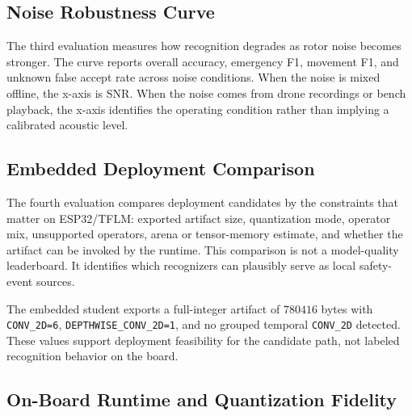\subsection{Noise Robustness Curve}

The third evaluation measures how recognition degrades as rotor noise becomes stronger. The curve reports overall accuracy, emergency F1, movement F1, and unknown false accept rate across noise conditions. When the noise is mixed offline, the x-axis is SNR. When the noise comes from drone recordings or bench playback, the x-axis identifies the operating condition rather than implying a calibrated acoustic level.

\subsection{Embedded Deployment Comparison}

The fourth evaluation compares deployment candidates by the constraints that matter on ESP32/TFLM: exported artifact size, quantization mode, operator mix, unsupported operators, arena or tensor-memory estimate, and whether the artifact can be invoked by the runtime. This comparison is not a model-quality leaderboard. It identifies which recognizers can plausibly serve as local safety-event sources.

The embedded student exports a full-integer artifact of $780416$ bytes with \texttt{CONV\_2D=6}, \texttt{DEPTHWISE\_CONV\_2D=1}, and no grouped temporal \texttt{CONV\_2D} detected. These values support deployment feasibility for the candidate path, not labeled recognition behavior on the board.

\subsection{On-Board Runtime and Quantization Fidelity}

